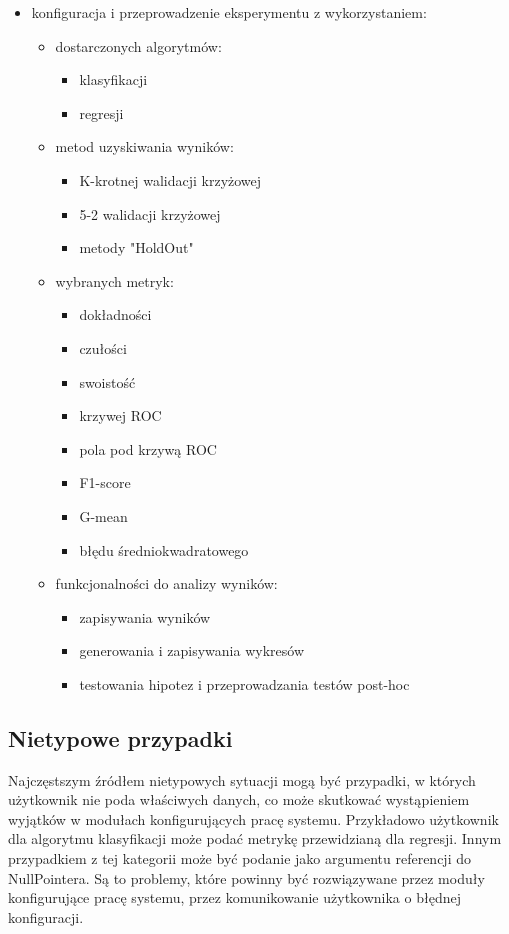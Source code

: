 \documentclass[12pt]{article}
\begin{document}
\begin{itemize}
	\item konfiguracja i przeprowadzenie eksperymentu z wykorzystaniem:
	\begin{itemize}
		\item dostarczonych algorytmów:
		\begin{itemize}
			\item klasyfikacji
			\item regresji		
		\end{itemize}
		\item metod uzyskiwania wyników:
		\begin{itemize}
			\item K-krotnej walidacji krzyżowej
			\item 5-2 walidacji krzyżowej
			\item metody "HoldOut"
		\end{itemize}
		\item wybranych metryk:
		\begin{itemize}
			\item dokładności
			\item czułości
			\item swoistość
			\item krzywej ROC
			\item pola pod krzywą ROC
			\item F1-score
			\item G-mean
			\item błędu średniokwadratowego
		\end{itemize}
		\item funkcjonalności do analizy wyników:
		\begin{itemize}
			\item zapisywania wyników
			\item generowania i zapisywania wykresów
			\item testowania hipotez i przeprowadzania testów post-hoc
		\end{itemize}
	\end{itemize}
\end{itemize}

\subsection{Nietypowe przypadki}

Najczęstszym źródłem nietypowych sytuacji mogą być przypadki, w których użytkownik nie poda właściwych danych, co może skutkować wystąpieniem wyjątków w modułach konfigurujących pracę systemu. Przykładowo użytkownik dla algorytmu klasyfikacji może podać metrykę przewidzianą dla regresji. Innym przypadkiem z tej kategorii może być podanie jako argumentu referencji do NullPointera. Są to problemy, które powinny być rozwiązywane przez moduły konfigurujące pracę systemu, przez komunikowanie użytkownika o błędnej konfiguracji.
 
\end{document}
